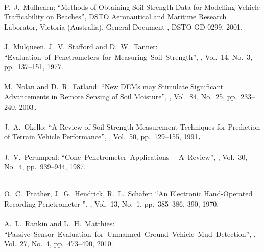 \begin{mythebibliography}{}
\leavevmode \\P.~J.~Mulhearn:
\newblock ``Methods of Obtaining Soil Strength Data for Modelling Vehicle Trafficability on Beaches'',
\newblock DSTO Aeronautical and Maritime Research Laborator, Victoria (Australia), General Document , DSTO-GD-0299, 2001.
\\

\leavevmode \\J.~Mulqueen, J.~V.~Stafford and D.~W.~Tanner:
\newblock ``Evaluation~of~Penetrometers~for~Measuring~Soil~Strength'',
, Vol.~14, No.~3, pp.~137--151, 1977.
\\

\leavevmode \\M.~Nolan and D.~R.~Fatland:
\newblock ``New DEMs may Stimulate Significant Advancements in Remote Sensing of Soil Moisture'',
, Vol.~84, No.~25, pp.~233--240, 2003．
\\

\leavevmode \\J.~A.~Okello:
\newblock ``A Review of Soil Strength Measurement Techniques for
Prediction of Terrain Vehicle Performance'',
, Vol.~50, pp.~129--155, 1991．
\\

\leavevmode \\J.~V.~Perumpral:
\newblock ``Cone~Penetrometer~Applications~-~A~Review'',
, Vol.~30, No.~4, pp.~939--944, 1987.
\\

\newpage

\leavevmode \\O.~C.~Prather, J.~G.~Hendrick, R.~L.~Schafer:
\newblock ``An Electronic Hand-Operated Recording Penetrometer '',
, Vol.~13, No.~1, pp.~385--386, 390, 1970.
\\

\leavevmode \\A.~L.~Rankin and L.~H.~Matthies:
\newblock ``Passive~Sensor~Evaluation~for~Unmanned~Ground~Vehicle~Mud~Detection'',
, Vol.~27, No.~4, pp.~473--490, 2010.
\\


\end{mythebibliography}
